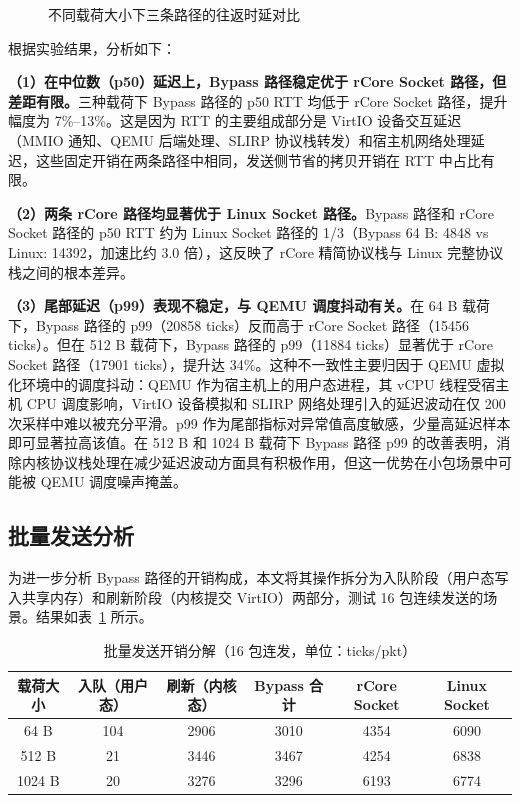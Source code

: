 \begin{figure}[htbp]
    \centering
    \caption{不同载荷大小下三条路径的往返时延对比}
    \label{fig:rtt-compare}
\end{figure}

根据实验结果，分析如下：

\textbf{（1）在中位数（p50）延迟上，Bypass 路径稳定优于 rCore Socket 路径，但差距有限。}三种载荷下 Bypass 路径的 p50 RTT 均低于 rCore Socket 路径，提升幅度为 7\%--13\%。这是因为 RTT 的主要组成部分是 VirtIO 设备交互延迟（MMIO 通知、QEMU 后端处理、SLIRP 协议栈转发）和宿主机网络处理延迟，这些固定开销在两条路径中相同，发送侧节省的拷贝开销在 RTT 中占比有限。

\textbf{（2）两条 rCore 路径均显著优于 Linux Socket 路径。}Bypass 路径和 rCore Socket 路径的 p50 RTT 约为 Linux Socket 路径的 1/3（Bypass 64 B: 4848 vs Linux: 14392，加速比约 3.0 倍），这反映了 rCore 精简协议栈与 Linux 完整协议栈之间的根本差异。

\textbf{（3）尾部延迟（p99）表现不稳定，与 QEMU 调度抖动有关。}在 64 B 载荷下，Bypass 路径的 p99（20858 ticks）反而高于 rCore Socket 路径（15456 ticks）。但在 512 B 载荷下，Bypass 路径的 p99（11884 ticks）显著优于 rCore Socket 路径（17901 ticks），提升达 34\%。这种不一致性主要归因于 QEMU 虚拟化环境中的调度抖动：QEMU 作为宿主机上的用户态进程，其 vCPU 线程受宿主机 CPU 调度影响，VirtIO 设备模拟和 SLIRP 网络处理引入的延迟波动在仅 200 次采样中难以被充分平滑。p99 作为尾部指标对异常值高度敏感，少量高延迟样本即可显著拉高该值。在 512 B 和 1024 B 载荷下 Bypass 路径 p99 的改善表明，消除内核协议栈处理在减少延迟波动方面具有积极作用，但这一优势在小包场景中可能被 QEMU 调度噪声掩盖。

\subsection{批量发送分析}

为进一步分析 Bypass 路径的开销构成，本文将其操作拆分为入队阶段（用户态写入共享内存）和刷新阶段（内核提交 VirtIO）两部分，测试 16 包连续发送的场景。结果如表~\ref{tab:burst} 所示。

\begin{table}[htbp]
    \centering
    \caption{批量发送开销分解（16 包连发，单位：ticks/pkt）}
    \label{tab:burst}
    \begin{tabular}{cccccc}
        \toprule
        载荷大小 & 入队（用户态） & 刷新（内核态） & Bypass 合计 & rCore Socket & Linux Socket \\
        \midrule
        64 B   & 104  & 2906  & 3010  & 4354  & 6090 \\
        512 B  & 21   & 3446  & 3467  & 4254  & 6838 \\
        1024 B & 20   & 3276  & 3296  & 6193  & 6774 \\
        \bottomrule
    \end{tabular}
\end{table}

